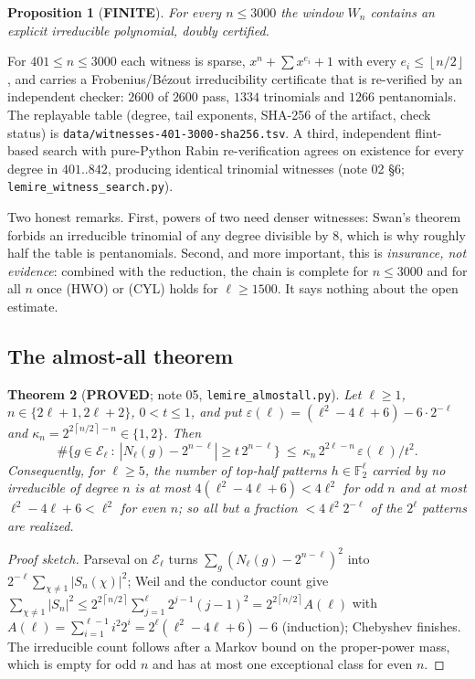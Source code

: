 \documentclass[10pt]{article}
\theoremstyle{plain}
\newtheorem{theorem}{Theorem}[section]
\newtheorem{proposition}[theorem]{Proposition}
\theoremstyle{definition}
\newcommand{\F}{\mathbb F}
\newcommand{\E}{\mathcal E}
\newcommand{\ceil}[1]{\left\lceil #1\right\rceil}
\newcommand{\flr}[1]{\left\lfloor #1\right\rfloor}
\newcommand{\proved}{\textcolor{proved}{\textsf{\textbf{\footnotesize PROVED}}}}
\newcommand{\finite}{\textcolor{finite}{\textsf{\textbf{\footnotesize FINITE}}}}
\begin{document}
\begin{proposition}[\finite]\label{prop:cert}
For every $n\le3000$ the window $W_n$ contains an explicit irreducible
polynomial, doubly certified.
\end{proposition}

For $401\le n\le3000$ each witness is sparse, $x^n+\sum x^{e_i}+1$ with every
$e_i\le\flr{n/2}$, and carries a Frobenius/B\'ezout irreducibility certificate
that is re-verified by an independent checker: $2600$ of $2600$ pass, $1334$
trinomials and $1266$ pentanomials. The replayable table (degree, tail
exponents, SHA-256 of the artifact, check status) is
\texttt{data/witnesses-401-3000-sha256.tsv}. A third, independent flint-based
search with pure-Python Rabin re-verification agrees on existence for every
degree in $401..842$, producing identical trinomial witnesses (note 02
\S6; \texttt{lemire\_witness\_search.py}).

Two honest remarks. First, powers of two need denser witnesses: Swan's theorem
forbids an irreducible trinomial of any degree divisible by $8$, which is why
roughly half the table is pentanomials. Second, and more important, this is
\emph{insurance, not evidence}: combined with the reduction, the chain is
complete for $n\le3000$ and for all $n$ once (HWO) or (CYL) holds for
$\ell\ge1500$. It says nothing about the open estimate.

\subsection{The almost-all theorem}

\begin{theorem}[\proved; note 05, \texttt{lemire\_almostall.py}]\label{thm:aa}
Let $\ell\ge1$, $n\in\{2\ell+1,2\ell+2\}$, $0<t\le1$, and put
$\varepsilon(\ell)=(\ell^2-4\ell+6)-6\cdot2^{-\ell}$ and
$\kappa_n=2^{2\ceil{n/2}-n}\in\{1,2\}$. Then
\[
 \#\bigl\{g\in\E_\ell\ :\ |N_\ell(g)-2^{n-\ell}|\ge t\,2^{n-\ell}\bigr\}
 \ \le\ \kappa_n\,2^{2\ell-n}\,\varepsilon(\ell)/t^2 .
\]
Consequently, for $\ell\ge5$, the number of top-half patterns
$h\in\F_2^{\ell}$ carried by \emph{no} irreducible of degree $n$ is at most
$4(\ell^2-4\ell+6)<4\ell^2$ for odd $n$ and at most $\ell^2-4\ell+6<\ell^2$ for
even $n$; so all but a fraction $<4\ell^2 2^{-\ell}$ of the $2^{\ell}$ patterns
are realized.
\end{theorem}

\begin{proof}[Proof sketch]
Parseval on $\E_\ell$ turns $\sum_g(N_\ell(g)-2^{n-\ell})^2$ into
$2^{-\ell}\sum_{\chi\ne1}|S_n(\chi)|^2$; Weil and the conductor count give
$\sum_{\chi\ne1}|S_n|^2\le2^{2\ceil{n/2}}\sum_{j=1}^{\ell}2^{j-1}(j-1)^2
=2^{2\ceil{n/2}}A(\ell)$ with
$A(\ell)=\sum_{i=1}^{\ell-1}i^2 2^i=2^{\ell}(\ell^2-4\ell+6)-6$ (induction);
Chebyshev finishes. The irreducible count follows after a Markov bound on the
proper-power mass, which is empty for odd $n$ and has at most one exceptional
class for even $n$.
\end{proof}
\end{document}
